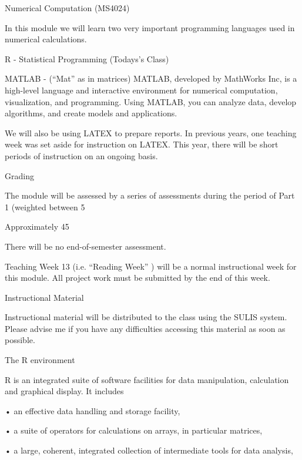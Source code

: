 
Numerical Computation (MS4024) 


In this module we will learn two very important programming languages used in numerical calculations.


R - Statistical Programming (Todays’s Class)


MATLAB - (“Mat” as in matrices) MATLAB, developed by MathWorks Inc, is a high-level language and interactive environment for numerical computation, visualization, and programming. Using MATLAB, you can analyze data, develop algorithms, and create models and applications. 


We will also be using LATEX to prepare reports.  In previous years, one teaching week was set aside for instruction on LATEX. This year, there will be short periods of instruction on an ongoing basis. 

Grading

The module will be assessed by a series of assessments during the period of Part 1 (weighted between 5%


Approximately 45%


There will be no end-of-semester assessment.


Teaching Week 13 (i.e. “Reading Week” ) will be a normal instructional week for this module. All project work must be submitted by the end of this week.


Instructional Material 

Instructional material will be distributed to the class using the SULIS system. Please advise me if you have any difficulties accessing this material as soon as possible.





The R environment


R is an integrated suite of software facilities for data manipulation, calculation and graphical display. It includes

•
an effective data handling and storage facility,

•
a suite of operators for calculations on arrays, in particular matrices,

•
a large, coherent, integrated collection of intermediate tools for data analysis,

